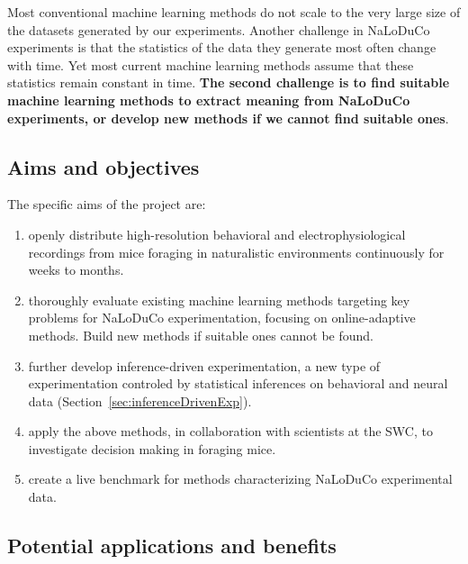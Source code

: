 Most conventional machine learning methods do not scale to the very large size
of the datasets generated by our experiments.  Another challenge in NaLoDuCo
experiments is that the statistics of the data they generate most often change
with time. Yet most current machine learning methods assume that these
statistics remain constant in time.
%
\textbf{The second challenge is to find suitable machine learning methods to
extract meaning from NaLoDuCo experiments, or develop new methods if we cannot
find suitable ones}.

\subsection{Aims and objectives}

The specific aims of the project are:

\begin{enumerate}

    \item openly distribute high-resolution behavioral and electrophysiological
        recordings from mice foraging in naturalistic environments continuously
        for weeks to months.

    \item thoroughly evaluate existing machine learning methods targeting
        key problems for NaLoDuCo experimentation, focusing on online-adaptive
        methods.
        Build new methods if suitable ones cannot be found.

    \item further develop inference-driven experimentation, a new type of
        experimentation controled by statistical inferences on behavioral and
        neural data (Section~\ref{sec:inferenceDrivenExp}).

    \item apply the above methods, in collaboration with scientists at the SWC,
        to investigate decision making in foraging mice.

    \item create a live benchmark for methods characterizing NaLoDuCo
        experimental data.

\end{enumerate}

\subsection{Potential applications and benefits}

